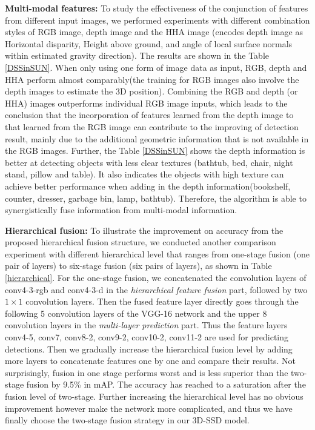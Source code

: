 \documentclass[10pt,twocolumn,letterpaper]{article}
\begin{document}
	\vspace{1mm}
	\noindent\textbf{Multi-modal features:} To study the effectiveness of the conjunction of features from different input images, we performed experiments with different combination styles of RGB image, depth image and the HHA image \cite{S2014rich}(encodes depth image as Horizontal disparity, Height above ground, and angle of local surface normals within estimated gravity direction). The results are shown in the Table \ref{DSSinSUN}. When only using one form of image data as input, RGB, depth and HHA perform almost comparably(the training for RGB images also involve the depth images to estimate the 3D position). Combining the RGB and depth (or HHA) images outperforms individual RGB image inputs, which leads to the conclusion that the incorporation of features learned from the depth image to that learned from the RGB image can contribute to the improving of detection result, mainly due to the additional geometric information that is not available in the RGB images. Further, the Table \ref{DSSinSUN} shows the depth information is better at detecting objects with less clear textures (\eg bathtub, bed, chair, night stand, pillow and table). It also indicates the objects with high texture can achieve better performance when adding in the depth information(\eg bookshelf, counter, dresser, garbage bin, lamp, bathtub). Therefore, the algorithm is able to synergistically fuse information from multi-modal information. \par
	\vspace{1mm}
	\noindent\textbf{Hierarchical fusion:} To illustrate the improvement on accuracy from the proposed hierarchical fusion structure, we conducted another comparison experiment with different hierarchical level that ranges from one-stage fusion (one pair of layers) to six-stage fusion (six pairs of layers), as shown in Table \ref{hierarchical}. For the one-stage fusion, we concatenated the convolution layers of conv4-3-rgb and conv4-3-d in the \emph{hierarchical feature fusion} part, followed by two $1\times1$ convolution layers. Then the fused feature layer directly goes through the following 5 convolution layers of the VGG-16 network and the upper 8 convolution layers in the \emph{multi-layer prediction} part. Thus the feature layers conv4-5, conv7, conv8-2, conv9-2, conv10-2, conv11-2 are used for predicting detections. Then we gradually increase the hierarchical fusion level by adding more layers to concatenate features one by one and compare their results. Not surprisingly, fusion in one stage performs worst and is less superior than the two-stage fusion by 9.5\% in mAP. The accuracy has reached to a saturation after the fusion level of two-stage. Further increasing the hierarchical level has no obvious improvement however make the network more complicated, and thus we have finally choose the two-stage fusion strategy in our 3D-SSD model. \par
\end{document}

